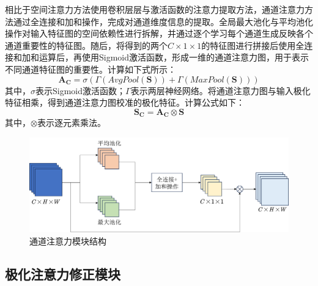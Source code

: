 相比于空间注意力方法使用卷积层层与激活函数的注意力提取方法，通道注意力方法通过全连接和加和操作，完成对通道维度信息的提取。全局最大池化与平均池化操作对输入特征图的空间依赖性进行拆解，并通过逐个学习每个通道生成反映各个通道重要性的特征图。随后，将得到的两个$C\times 1 \times 1$的特征图进行拼接后使用全连接和加和运算后，再使用Sigmoid激活函数，形成一维的通道注意力图，用于表示不同通道特征图的重要性。计算如下式所示：
\begin{equation}
    \textbf{A}_\textbf{C}=\sigma(\Gamma(AvgPool(\textbf{S}))+\Gamma(MaxPool(\textbf{S})))
\end{equation}
其中，$\sigma$表示Sigmoid激活函数；$\Gamma$表示两层神经网络。将通道注意力图与输入极化特征相乘，得到通道注意力图校准的极化特征。计算公式如下：
\begin{equation}
    \textbf{S}_\textbf{C}=\textbf{A}_\textbf{C} \otimes \textbf{S}
\end{equation}
其中，$\otimes$表示逐元素乘法。

\begin{figure}[ht!]
    \centering
    \includegraphics[width=14cm]{pic/chapter3/Channel.png}
    \caption{通道注意力模块结构}
    \label{fig:channel}
\end{figure}

\subsection{极化注意力修正模块}
\label{sec:极化注意力修正模块}

